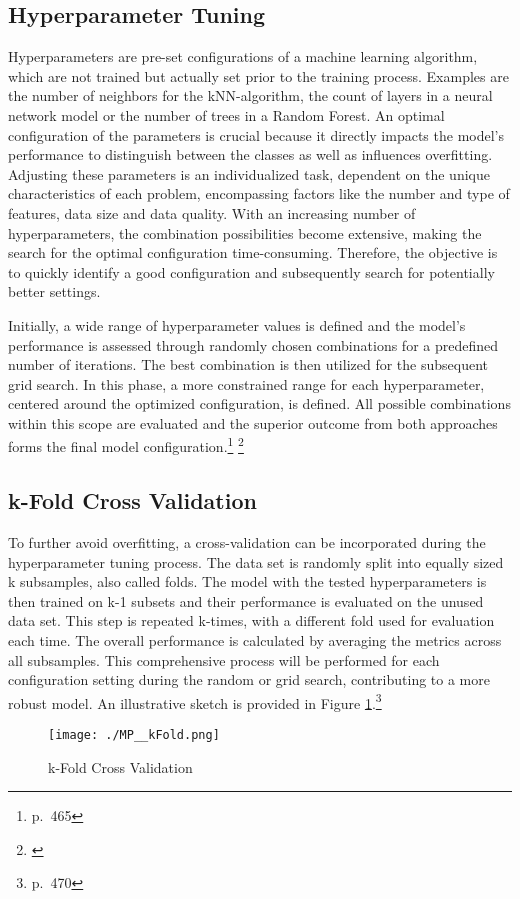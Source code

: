 \subsection{Hyperparameter Tuning}
Hyperparameters are pre-set configurations of a machine learning algorithm, which are not trained but actually set prior to the training process. Examples are the number of neighbors for the kNN-algorithm, the count of layers in a neural network model or the number of trees in a Random Forest. An optimal configuration of the parameters is crucial because it directly impacts the model's performance to distinguish between the classes as well as influences overfitting. Adjusting these parameters is an individualized task, dependent on the unique characteristics of each problem, encompassing factors like the number and type of features, data size and data quality. With an increasing number of hyperparameters, the combination possibilities become extensive, making the search for the optimal configuration time-consuming. Therefore, the objective is to quickly identify a good configuration and subsequently search for potentially better settings.

Initially, a wide range of hyperparameter values is defined and the model's performance is assessed through randomly chosen combinations for a predefined number of iterations. The best combination is then utilized for the subsequent grid search. In this phase, a more constrained range for each hyperparameter, centered around the optimized configuration, is defined. All possible combinations within this scope are evaluated and the superior outcome from both approaches forms the final model configuration.\footnote{\cite{Python:2022} p.~465} \footnote{\cite{RanFor:2023}}

\subsection{k-Fold Cross Validation}
To further avoid overfitting, a cross-validation can be incorporated during the hyperparameter tuning process. The data set is randomly split into equally sized k subsamples, also called folds. The model with the tested hyperparameters is then trained on k-1 subsets and their performance is evaluated on the unused data set. This step is repeated k-times, with a different fold used for evaluation each time. The overall performance is calculated by averaging the metrics across all subsamples. This comprehensive process will be performed for each configuration setting during the random or grid search, contributing to a more robust model. An illustrative sketch is provided in Figure \ref{fig:re_wholesample}.\footnote{\cite{Python:2022} p.~470}

\begin{figure}[H]
	\centering
	\texttt{[image: ./MP\_\_kFold.png]}
    \caption{k-Fold Cross Validation}
    \label{fig:re_wholesample}
\end{figure}